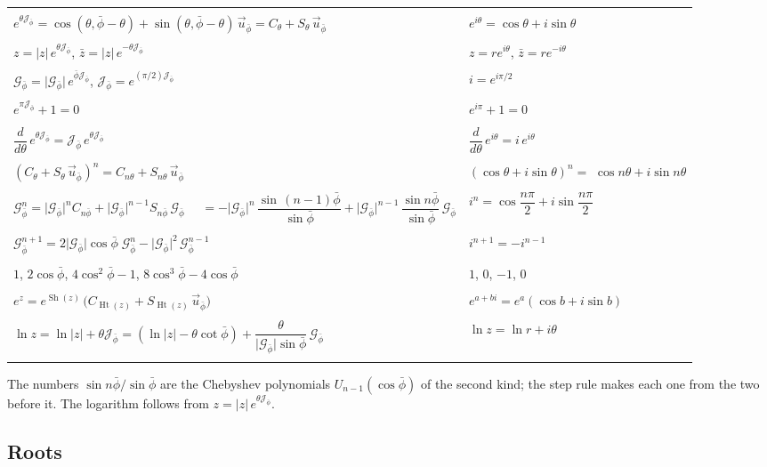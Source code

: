 \documentclass[11pt,a4paper]{amsart}
\makeatletter
\theoremstyle{plain}
\theoremstyle{definition}
\theoremstyle{remark}
\newcommand{\pb}{\bar{\phi}}                     %
\newcommand{\Gp}{\mathcal{G}_{\bar{\phi}}}       %
\newcommand{\up}{\vec{u}_{\bar{\phi}}}           %
\newcommand{\Jp}{\mathcal{J}_{\bar{\phi}}}       %
\DeclareMathOperator{\Sh}{Sh}                    %
\DeclareMathOperator{\Ht}{Ht}                    %
\newcommand{\gnlaw}[3]{\multicolumn{2}{@{}l@{}}{\small\itshape #1}\\* #2 & #3 \\ \addlinespace[4pt]}
\newenvironment{gnlaws}{%
  \begin{longtable}{@{}>{\small\raggedright\arraybackslash}p{0.62\textwidth}@{\hspace{0.04\textwidth}}>{\small\raggedright\arraybackslash}p{0.32\textwidth}@{}}
  \toprule
  \multicolumn{1}{@{}l}{\textsc{in a relative plane}} & \multicolumn{1}{l@{}}{\textsc{the complex case}} \\
  \midrule
  \endhead
  \bottomrule
  \endlastfoot}
  {\end{longtable}}
\makeatother
\begin{document}
\begin{gnlaws}
\gnlaw{Euler's formula (\Cref{thm:euler})}
  {$e^{\theta\Jp} = \cos(\theta, \pb - \theta) + \sin(\theta, \pb - \theta)\,\up = C_\theta + S_\theta\,\up$}
  {$e^{i\theta} = \cos\theta + i\sin\theta$}
\gnlaw{exponential form (\Cref{thm:euler})}
  {$z = \lvert z\rvert\,e^{\theta\Jp}$, \quad $\bar{z} = \lvert z\rvert\,e^{-\theta\Jp}$}
  {$z = re^{i\theta}$, \quad $\bar{z} = re^{-i\theta}$}
\gnlaw{the two units as exponentials (\Cref{thm:euler})}
  {$\Gp = \lvert\Gp\rvert\,e^{\pb\Jp}$, \quad $\Jp = e^{(\pi/2)\Jp}$}
  {$i = e^{i\pi/2}$}
\gnlaw{Euler's identity (\Cref{thm:euler})}
  {$e^{\pi\Jp} + 1 = 0$}
  {$e^{i\pi} + 1 = 0$}
\gnlaw{the rate of turning (\Cref{rem:euler-native})}
  {$\dfrac{d}{d\theta}\,e^{\theta\Jp} = \Jp\,e^{\theta\Jp}$}
  {$\dfrac{d}{d\theta}\,e^{i\theta} = i\,e^{i\theta}$}
\gnlaw{De Moivre's formula (\Cref{thm:de-moivre})}
  {$(C_\theta + S_\theta\,\up)^n = C_{n\theta} + S_{n\theta}\,\up$}
  {$(\cos\theta + i\sin\theta)^n = {}$ \newline $\cos n\theta + i\sin n\theta$}
\gnlaw{the powers of the Composer Unit (\Cref{cor:powers})}
  {$\Gp^n = \lvert\Gp\rvert^n C_{n\pb} + \lvert\Gp\rvert^{n-1}S_{n\pb}\,\Gp$ \newline $\quad = -\lvert\Gp\rvert^n\,\dfrac{\sin\,(n - 1)\pb}{\sin\pb} + \lvert\Gp\rvert^{n-1}\,\dfrac{\sin n\pb}{\sin\pb}\,\Gp$}
  {$i^n = \cos\dfrac{n\pi}{2} + i\sin\dfrac{n\pi}{2}$}
\gnlaw{the step rule (\Cref{cor:powers})}
  {$\Gp^{n+1} = 2\lvert\Gp\rvert\cos\pb\;\Gp^n - \lvert\Gp\rvert^2\,\Gp^{n-1}$}
  {$i^{n+1} = -i^{n-1}$}
\gnlaw{the numbers $\sin n\pb/\sin\pb$, for $n = 1, 2, 3, 4$}
  {$1$, \quad $2\cos\pb$, \quad $4\cos^2\pb - 1$, \quad $8\cos^3\pb - 4\cos\pb$}
  {$1$, \quad $0$, \quad $-1$, \quad $0$}
\gnlaw{the exponential of a General Number (\Cref{cor:two-trig})}
  {$e^z = e^{\Sh(z)}\,\bigl(C_{\Ht(z)} + S_{\Ht(z)}\,\up\bigr)$}
  {$e^{a + bi} = e^a(\cos b + i\sin b)$}
\gnlaw{the logarithm, for $-\pi < \theta \le \pi$}
  {$\ln z = \ln\lvert z\rvert + \theta\Jp = (\ln\lvert z\rvert - \theta\cot\pb) + \dfrac{\theta}{\lvert\Gp\rvert\sin\pb}\,\Gp$}
  {$\ln z = \ln r + i\theta$}
\end{gnlaws}
The numbers $\sin n\pb/\sin\pb$ are the Chebyshev polynomials $U_{n-1}(\cos\pb)$ of the second kind; the step rule makes each one from the two before it. The logarithm follows from $z = \lvert z\rvert\,e^{\theta\Jp}$.

\subsection{Roots}\label{app:roots}
\end{document}
